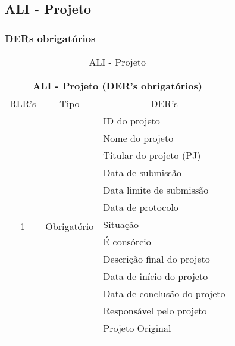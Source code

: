     \vfill
    \pagebreak
    \subsection{ALI - Projeto}
      
      \subsubsection*{DERs obrigatórios}
      
	  \begin{table}[!h]
	  \centering
	  \caption{ALI - Projeto}
	  \label{ali_projeto}
	  \begin{tabular}{|c|c|l|}
	  \hline
	  \multicolumn{3}{|c|}{\textbf{ALI - Projeto (DER's obrigatórios)}}                                                      \\ \hline
	  \multicolumn{1}{|l|}{RLR's} & Tipo                         & \multicolumn{1}{c|}{DER's}  \\ \hline
	  \multirow{20}{*}{1}  &\multirow{20}{*}{Obrigatório} & ID do projeto               \\ \cline{3-3} 
			      &                              & Nome do projeto             \\ \cline{3-3} 
			      &                              & Titular do projeto (PJ)     \\ \cline{3-3} 
			      &                              & Data de submissão           \\ \cline{3-3}
			      &				     & Data limite de submissão    \\ \cline{3-3}
			      &                              & Data de protocolo           \\ \cline{3-3} 
			      &                              & Situação                    \\ \cline{3-3} 
			      &                              & É consórcio                 \\ \cline{3-3} 
			      &                              & Descrição final do projeto          \\ \cline{3-3} 
			      &                              & Data de início do projeto                  \\ \cline{3-3} 
			      &                              & Data de conclusão do projeto                 \\ \cline{3-3}
			      &                              & Responsável pelo projeto    \\ \cline{3-3}
			      &   & Projeto Original               \\ \cline{3-3}

\end{tabular}
\end{table}
